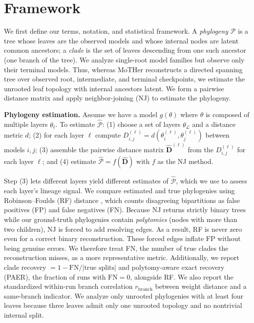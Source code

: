 \documentclass{article}
\theoremstyle{definition}
\theoremstyle{plain}
\begin{document}
%


\section{Framework}
\label{sec:framework}

We first define our terms, notation, and statistical framework. A \emph{phylogeny} $\mathcal{P}$ is a tree
whose leaves are the observed models and whose internal nodes are latent common ancestors; a
\emph{clade} is the set of leaves descending from one such ancestor (one branch of the tree). We analyze
single-root model families but observe only their terminal models. Thus, whereas MoTHer
\citep{horwitz2025mother} reconstructs a directed spanning tree over observed root, intermediate, and
terminal checkpoints, we estimate the unrooted leaf topology with internal ancestors latent. We form a pairwise distance matrix and apply neighbor-joining (NJ)
\citep{saitou1987neighbor} to estimate the phylogeny.

\textbf{Phylogeny estimation.}\label{sec:framework:phylo}
Assume we have a model $g(\theta)$ where $\theta$ is composed of multiple layers $\theta_\ell$. To estimate $\widehat{\mathcal{P}}$: (1) choose a set of layers $\theta_\mathcal{L}$ and a distance metric $d$;
(2) for each layer $\ell$ compute $D_{i,j}^{(\ell)} = d(\theta^{(\ell)}_i, \theta^{(\ell)}_j)$ between models
$i,j$; (3) assemble the pairwise distance matrix $\widehat{\mathbf{D}}^{(\ell)}$ from the $D_{i,j}^{(\ell)}$ for each layer $\ell$; and (4) estimate $\widehat{\mathcal{P}} = f(\widehat{\mathbf{D}})$ with $f$ as the NJ method.

Step (3) lets different layers yield different estimates of $\widehat{\mathcal{P}}$, which we use to
assess each layer's lineage signal. We compare estimated and true phylogenies using Robinson--Foulds (RF) distance \citep{robinson1981comparison}, which counts disagreeing bipartitions as false positives (FP) and false negatives (FN).
 Because NJ
returns strictly binary trees while our ground-truth phylogenies contain \textit{polytomies} (nodes with
more than two children), NJ is forced to add resolving edges. As a result, RF is never zero even for a correct binary
reconstruction. These forced edges inflate FP without being genuine errors. We therefore treat FN, the
number of true clades the reconstruction misses, as a more representative metric. Additionally, we report clade
recovery $= 1 - \mathrm{FN}/|\text{true splits}|$ and polytomy-aware exact recovery (PAER), the fraction of
runs with $\mathrm{FN}=0$, alongside RF. We also report the standardized within-run branch correlation
$r_{\mathrm{branch}}$ between weight distance and a same-branch indicator. We analyze only unrooted
phylogenies with at least four leaves because three leaves admit only one unrooted topology and no
nontrivial internal split.
\end{document}
